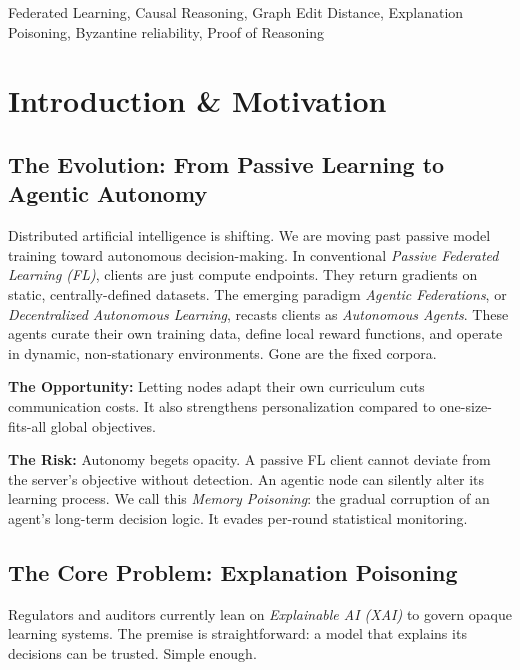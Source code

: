 \documentclass[journal]{IEEEtran}
\begin{document}
\begin{IEEEkeywords}
Federated Learning, Causal Reasoning, Graph Edit Distance, Explanation Poisoning, Byzantine reliability, Proof of Reasoning
\end{IEEEkeywords}


\section{Introduction \& Motivation}

\subsection{The Evolution: From Passive Learning to Agentic Autonomy}

Distributed artificial intelligence is shifting. We are moving past passive model training toward autonomous decision-making. In conventional \emph{Passive Federated Learning (FL)}, clients are just compute endpoints. They return gradients on static, centrally-defined datasets. The emerging paradigm \emph{Agentic Federations}, or \emph{Decentralized Autonomous Learning}, recasts clients as \emph{Autonomous Agents}. These agents curate their own training data, define local reward functions, and operate in dynamic, non-stationary environments. Gone are the fixed corpora.

\textbf{The Opportunity:}
Letting nodes adapt their own curriculum cuts communication costs. It also strengthens personalization compared to one-size-fits-all global objectives.

\textbf{The Risk:}
Autonomy begets opacity. A passive FL client cannot deviate from the server's objective without detection. An agentic node can silently alter its learning process. We call this \emph{Memory Poisoning}: the gradual corruption of an agent's long-term decision logic. It evades per-round statistical monitoring.

\subsection{The Core Problem: Explanation Poisoning}

Regulators and auditors currently lean on \emph{Explainable AI (XAI)} to govern opaque learning systems. The premise is straightforward: a model that explains its decisions can be trusted. Simple enough.
\end{document}
